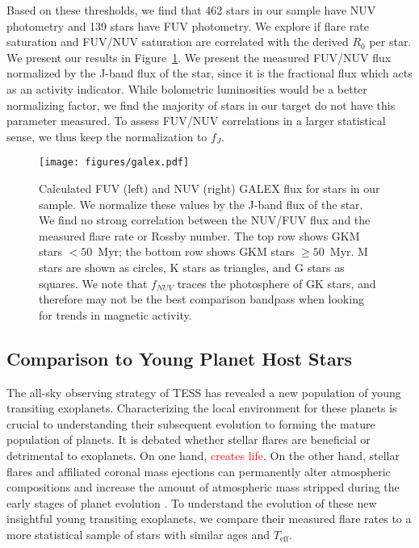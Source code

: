 \documentclass[twocolumn]{aastex631}
\begin{document}
Based on these thresholds, we find that 462 stars in our sample have NUV photometry and
139 stars have FUV photometry. We explore if flare rate saturation and FUV/NUV saturation
are correlated with the derived $R_0$ per star. We present our results in Figure~\ref{fig:galex}.
We present the measured FUV/NUV flux normalized by the J-band flux of the star, since it
is the fractional flux which acts as an activity indicator. While bolometric luminosities would
be a better normalizing factor, we find the majority of stars in our target do not have
this parameter measured. To assess FUV/NUV correlations in a larger statistical sense, we thus
keep the normalization to $f_J$.

\begin{figure}[ht!]
    \begin{centering}
        \texttt{[image: figures/galex.pdf]}
        \caption{
            Calculated FUV (left) and NUV (right) GALEX flux for stars in our
            sample. We normalize these values by the J-band flux of the star.
            We find no strong correlation between the NUV/FUV flux and the measured
            flare rate or Rossby number.
            The top row shows GKM stars $<50$~Myr; the bottom row
            shows GKM stars $\geq 50$~Myr. M stars are shown as circles, K stars as
            triangles, and G stars as squares. We note that $f_{NUV}$ traces the
            photosphere of GK stars, and therefore may not be the best comparison
            bandpass when looking for trends in magnetic activity.
        }
        \label{fig:galex}
    \end{centering}
\end{figure}



\subsection{Comparison to Young Planet Host Stars}

The all-sky observing strategy of TESS has revealed a new population of young transiting exoplanets.
Characterizing the local environment for these planets is crucial to understanding their subsequent evolution
to forming the mature population of planets. It is debated whether stellar flares are beneficial or detrimental
to exoplanets. On one hand, \textcolor{red}{creates life}. On the other hand, stellar flares and affiliated
coronal mass ejections can permanently alter atmospheric compositions \citep{chen21} and increase the amount of
atmospheric mass stripped during the early stages of planet evolution \citep{feinstein20}. To understand the
evolution of these new insightful young transiting exoplanets, we compare their measured flare rates to a more
statistical sample of stars with similar ages and $T_\textrm{eff}$.
\end{document}
